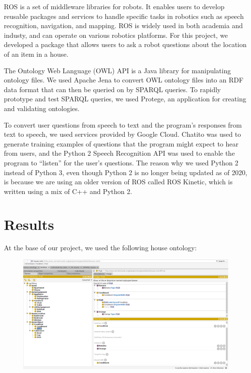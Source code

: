 \documentclass{article}
\begin{document}
ROS is a set of middleware libraries for robots. It enables users to develop 
reusable packages and services to handle specific tasks in robotics such as
speech recognition, navigation, and mapping. ROS is widely used in both
academia and industy, and can operate on various robotics platforms. 
For this project, we developed a package that allows users to ask a robot 
questions about the location of an item in a house. 

The Ontology Web Language (OWL) API is a Java library for manipulating 
ontology files. We used Apache Jena to convert OWL ontology files into an 
RDF data format that can then be queried on by SPARQL queries.
To rapidly prototype and test SPARQL queries, we used Protege, an application
for creating and validating ontologies. 

To convert user questions from speech to text and the program's responses 
from text to speech, we used services provided by Google Cloud. Chatito was
used to generate training examples of questions that the program might expect
to hear from users, and the Python 2 Speech Recognition API was used to 
enable the program to ``listen'' for the user's questions. The reason why we
used Python 2 instead of Python 3, even though Python 2 is no longer being 
updated as of 2020, is because we are using an older version of ROS called 
ROS Kinetic, which is written using a mix of C++ and Python 2.

\newpage

\section{Results}
At the base of our project, we used the following house ontology:
\begin{figure}[H]
\centering
\includegraphics[width=\textwidth]{onto_protege.png}
\end{figure}
\end{document}
